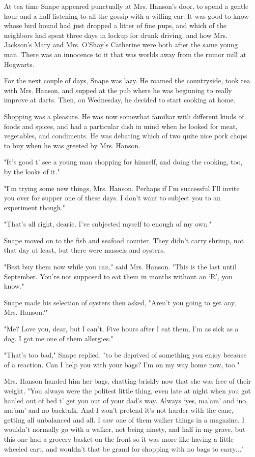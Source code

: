 At tea time Snape appeared punctually at Mrs. Hanson's door, to spend a gentle hour and a half listening to all the gossip with a willing ear. It was good to know whose bird hound had just dropped a litter of fine pups, and which of the neighbors had spent three days in lockup for drunk driving, and how Mrs. Jackson's Mary and Mrs. O'Shay's Catherine were both after the same young man. There was an innocence to it that was worlds away from the rumor mill at Hogwarts.

For the next couple of days, Snape was lazy. He roamed the countryside, took tea with Mrs. Hanson, and supped at the pub where he was beginning to really improve at darts. Then, on Wednesday, he decided to start cooking at home.

Shopping was a pleasure. He was now somewhat familiar with different kinds of foods and spices, and had a particular dish in mind when he looked for meat, vegetables, and condiments. He was debating which of two quite nice pork chops to buy when he was greeted by Mrs. Hanson.

"It's good t' see a young man shopping for himself, and doing the cooking, too, by the looks of it."

"I'm trying some new things, Mrs. Hanson. Perhaps if I'm successful I'll invite you over for supper one of these days. I don't want to subject you to an experiment though."

"That's all right, dearie. I've subjected myself to enough of my own."

Snape moved on to the fish and seafood counter. They didn't carry shrimp, not that day at least, but there were mussels and oysters.

"Best buy them now while you can," said Mrs. Hanson. "This is the last until September. You're not supposed to eat them in months without an `R', you know."

Snape made his selection of oysters then asked, "Aren't you going to get any, Mrs. Hanson?"

"Me? Love you, dear, but I can't. Five hours after I eat them, I'm as sick as a dog. I got me one of them allergies."

"That's too bad," Snape replied. "to be deprived of something you enjoy because of a reaction. Can I help you with your bags? I'm on my way home now, too."

Mrs. Hanson handed him her bags, chatting briskly now that she was free of their weight. "You always were the politest little thing, even late at night when you got hauled out of bed t' get you out of your dad's way. Always `yes, ma'am' and `no, ma'am' and no backtalk. And I won't pretend it's not harder with the cane, getting all unbalanced and all. I saw one of them walker things in a magazine. I wouldn't normally go with a walker, not being ninety, and half in my grave, but this one had a grocery basket on the front so it was more like having a little wheeled cart, and wouldn't that be grand for shopping with no bags to carry..."

